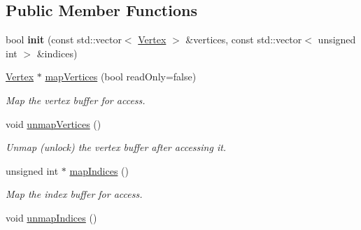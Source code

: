 \subsection*{Public Member Functions}
\begin{DoxyCompactItemize}
\item 
bool {\bfseries init} (const std\+::vector$<$ \hyperlink{struct_lots_of_lines_1_1_vertex}{Vertex} $>$ \&vertices, const std\+::vector$<$ unsigned int $>$ \&indices)\hypertarget{class_lots_of_lines_1_1_open_g_l_vertex_buffer_object_a5c7e13ab9c0d5baba3aba0bf1bb2bb22}{}\label{class_lots_of_lines_1_1_open_g_l_vertex_buffer_object_a5c7e13ab9c0d5baba3aba0bf1bb2bb22}

\item 
\hyperlink{struct_lots_of_lines_1_1_vertex}{Vertex} $\ast$ \hyperlink{class_lots_of_lines_1_1_open_g_l_vertex_buffer_object_a842ae500f862c5fb011ce1fa93478236}{map\+Vertices} (bool read\+Only=false)
\begin{DoxyCompactList}\small\item\em Map the vertex buffer for access. \end{DoxyCompactList}\item 
void \hyperlink{class_lots_of_lines_1_1_open_g_l_vertex_buffer_object_ad3e09ea6ff43545352e9df6da5072beb}{unmap\+Vertices} ()\hypertarget{class_lots_of_lines_1_1_open_g_l_vertex_buffer_object_ad3e09ea6ff43545352e9df6da5072beb}{}\label{class_lots_of_lines_1_1_open_g_l_vertex_buffer_object_ad3e09ea6ff43545352e9df6da5072beb}

\begin{DoxyCompactList}\small\item\em Unmap (unlock) the vertex buffer after accessing it. \end{DoxyCompactList}\item 
unsigned int $\ast$ \hyperlink{class_lots_of_lines_1_1_open_g_l_vertex_buffer_object_a59c71c761341ca1732b5816bdfe6d239}{map\+Indices} ()
\begin{DoxyCompactList}\small\item\em Map the index buffer for access. \end{DoxyCompactList}\item 
void \hyperlink{class_lots_of_lines_1_1_open_g_l_vertex_buffer_object_ad0c16f10859218f09a42ffbd4dd747b0}{unmap\+Indices} ()\hypertarget{class_lots_of_lines_1_1_open_g_l_vertex_buffer_object_ad0c16f10859218f09a42ffbd4dd747b0}{}\label{class_lots_of_lines_1_1_open_g_l_vertex_buffer_object_ad0c16f10859218f09a42ffbd4dd747b0}


\end{DoxyCompactItemize}
